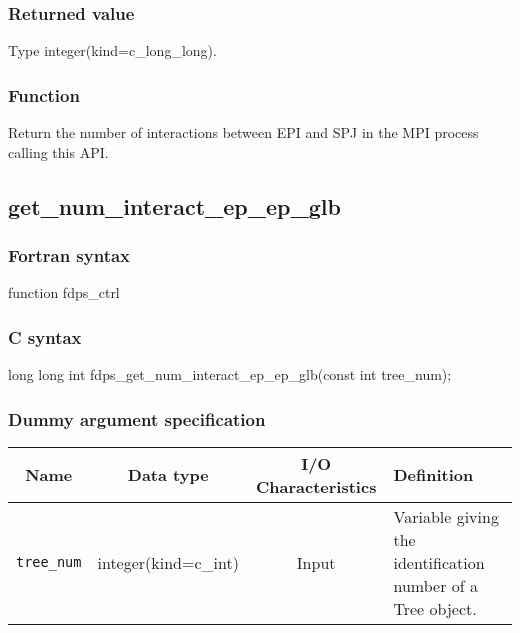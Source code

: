 \subsubsection*{Returned value}
Type integer(kind=c\_long\_long).

\subsubsection*{Function}
Return the number of interactions between EPI and SPJ in the MPI process calling this API.
\clearpage

\subsection{get\_num\_interact\_ep\_ep\_glb}
\subsubsection*{Fortran syntax}
\begin{screen}
\begin{spverbatim}
function fdps_ctrl%
\end{spverbatim}
\end{screen}

\subsubsection*{C syntax}
\begin{screen}
\begin{spverbatim}
long long int fdps_get_num_interact_ep_ep_glb(const int tree_num);
\end{spverbatim}
\end{screen}

\subsubsection*{Dummy argument specification}
\begin{table}[h]
\begin{tabularx}{\linewidth}{cccX}
\toprule
\rowcolor{Snow2}
Name & Data type & I/O Characteristics & Definition \\
\midrule
\verb|tree_num|  & integer(kind=c\_int)   & Input     & Variable giving the identification number of a Tree object. \\
\bottomrule
\end{tabularx}
\end{table}

